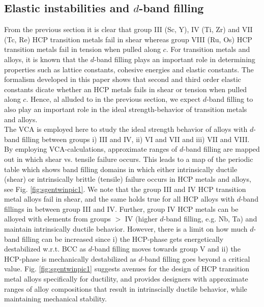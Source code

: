 \documentclass[showpacs,aps,floatfix,prb,reprint,superscriptaddress]{revtex4-1}
\begin{document}
 

\subsection{Elastic instabilities and $d$-band filling}
From the previous section it is clear that group III (Sc, Y), IV (Ti, Zr) and VII (Tc, Re) HCP transition metals fail in shear whereas group VIII (Ru, Os) HCP transition metals fail in tension when pulled along $c$. For transition metals and alloys, it is known that the $d$-band filling plays an important role in determining properties such as lattice constants, cohesive energies and elastic constants. The formalism developed in this paper shows that second and third order elastic constants dicate whether an HCP metals fails in shear or tension when pulled along $c$. Hence, al alluded to in the previous section, we expect $d$-band filling to also play an important role in the ideal strength-behavior of transition metals and alloys. \\

The VCA is employed here to study the ideal strength behavior of alloys with $d$-band filling between groups i) III and IV, ii) VI and VII and iii) VII and VIII. By employing VCA-calculations, approximate ranges of $d$-band filling are mapped out in which shear vs. tensile failure occurs. This leads to a map of the periodic table which shows band filling domains in which either intrinsically ductile (shear) or intrinsically brittle (tensile) failure occurs in HCP metals and alloys, see Fig. \ref{fig:sgentwinpic1}. We note that the group III and IV HCP transition metal alloys fail in shear, and the same holds true for all HCP alloys with $d$-band fillings in between group III and IV. Further, group IV HCP metals can be alloyed with elements from groups $>$ IV (higher $d$-band filling, e.g. Nb, Ta) and maintain intrinsically ductile behavior. However, there is a limit on how much $d$-band filling can be increased since i) the HCP-phase gets energetically destabilized w.r.t. BCC as $d$-band filling moves towards group V and ii) the HCP-phase is mechanically destabilized as $d$-band filling goes beyond a critical value. Fig. \ref{fig:sgentwinpic1} suggests avenues for the design of HCP transition metal alloys specifically for ductility, and provides designers with approximate ranges of alloy compositions that result in intrinscially ductile behavior, while maintaining mechanical stability. \\
\end{document}
